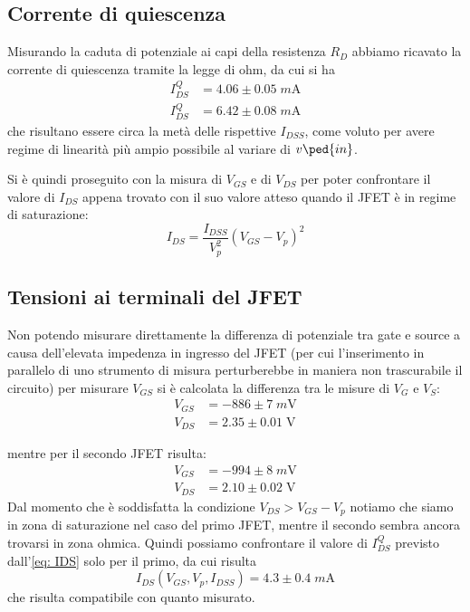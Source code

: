 \documentclass[10pt, a4paper, italian]{article}
\begin{document}
\subsection{Corrente di quiescenza}
Misurando la caduta di potenziale ai capi della resistenza $R_D$ abbiamo
ricavato la corrente di quiescenza tramite la legge di ohm, da cui si ha
\begin{align*}
I_{DS}^Q &= 4.06 \pm 0.05 \; \si{m\A} \\
I_{DS}^Q &= 6.42 \pm 0.08 \; \si{m\A}
\end{align*}
che risultano essere circa la metà delle rispettive $I_{DSS}$, come voluto
per avere regime di linearità più ampio possibile al variare di $v\ped{in}$.

Si è quindi proseguito con la misura di $V_{GS}$ e di $V_{DS}$ per poter
confrontare il valore di $I_{DS}$ appena trovato con il suo valore atteso
quando il JFET è in regime di saturazione:
\begin{equation}\label{eq: IDS}
I_{DS} = \frac{I_{DSS}}{V_p ^2}(V_{GS} - V_p)^2
\end{equation}

\subsection{Tensioni ai terminali del JFET}
Non potendo misurare direttamente la differenza di potenziale tra gate e
source a causa dell'elevata impedenza in ingresso del JFET (per cui
l'inserimento in parallelo di uno strumento di misura perturberebbe in
maniera non trascurabile il circuito) per misurare $V_{GS}$ si è calcolata la
differenza tra le misure di $V_G$ e $V_S$:
\begin{align*}
V_{GS} &= -886 \pm 7 \; \si{m\V} \\
V_{DS} &= 2.35 \pm 0.01 \; \si{\V}
\end{align*}

mentre per il secondo JFET risulta:
\begin{align*}
V_{GS} &= -994 \pm 8 \; \si{m\V} \\
V_{DS} &= 2.10 \pm 0.02 \; \si{\V}
\end{align*}
Dal momento che è soddisfatta la condizione $V_{DS} > V_{GS} - V_p$ notiamo che
siamo in zona di saturazione nel caso del primo JFET, mentre il secondo sembra
ancora trovarsi in zona ohmica. Quindi possiamo confrontare il valore di
$I_{DS}^Q$ previsto dall'\cref{eq: IDS} solo per il primo, da cui risulta 
\[
I_{DS}(V_{GS},V_p,I_{DSS}) = 4.3 \pm 0.4 \; \si{m\A}
\]
che risulta compatibile con quanto misurato.
\end{document}
